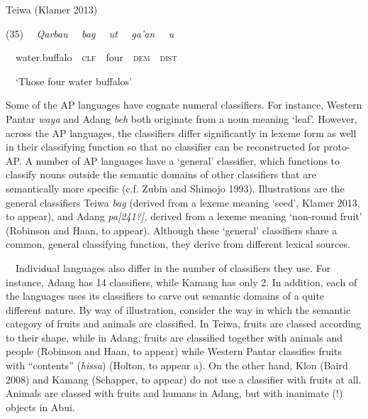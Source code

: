 Teiwa (Klamer 2013)

(35) \ \ \textit{Qarbau \ \ bag \ \ ut \ \ ga{\textquoteright}an \ \ u}

\ \ water.buffalo\ \ \textsc{clf}\ \ four\ \ \textsc{dem\ \ dist}

\ \ {\textquoteleft}Those four water buffalos{\textquoteright}\ \ \ \ \ \ \ \ \ \ \ \ 

Some of the AP languages have cognate numeral classifiers. For instance, Western Pantar \textit{waya} and Adang \textit{beh} both originate from a noun meaning {\textquoteleft}leaf{\textquoteright}. However, across the AP languages, the classifiers differ significantly in lexeme form as well in their classifying function so that no classifier can be reconstructed for proto-AP. A number of AP languages have a {\textquoteleft}general{\textquoteright} classifier, which functions to classify nouns outside the semantic domains of other classifiers that are semantically more specific (c.f. Zubin and Shimojo 1993). Illustrations are the general classifiers Teiwa \textit{bag }(derived from a lexeme meaning {\textquoteleft}seed{\textquoteright}, Klamer 2013, to appear),\textit{ }and Adang \textit{pa[241?], }derived from a lexeme meaning {\textquoteleft}non-round fruit{\textquoteright} (Robinson and Haan, to appear). Although these {\textquoteleft}general{\textquoteright} classifiers share a common, general 
classifying function, they derive from different lexical sources.

\ \ Individual languages also differ in the number of classifiers they use. For instance, Adang has 14 classifiers, while Kamang has only 2.  In addition, each of the languages uses its classifiers to carve out semantic domains of a quite different nature. By way of illustration, consider the way in which the semantic category of fruits and animals are classified. In Teiwa, fruits are classed according to their shape, while in Adang, fruits are classified together with animals and people (Robinson and Haan, to appear) while Western Pantar classifies fruits with {\textquotedblleft}contents{\textquotedblright} (\textit{hissa}) (Holton, to appear a). On the other hand, Klon (Baird 2008) and Kamang (Schapper, to appear) do not use a classifier with fruits at all. Animals are classed with fruits and humans in Adang, but with inanimate (!) objects in Abui. 

